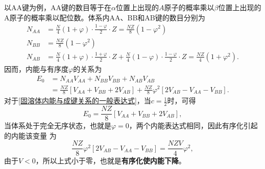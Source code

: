             以AA键为例，AA键的数目等于在$\alpha$位置上出现的$A$原子的概率乘以$\beta$位置上出现的
            A原子的概率乘以配位数。体系内AA、BB和AB键的数目分别为
            \begin{align}
                N_{A A}&=\frac{N}{4}(1+\varphi) \cdot \frac{1-\varphi}{2} \cdot Z=\frac{N Z}{8}\left(1-\varphi^{2}\right) \\
                N_{B B}&=\frac{N Z}{8}\left(1-\varphi^{2}\right) \\
                N_{A B}&=\frac{N}{4}(1+\varphi) \cdot \frac{1+\varphi}{2} \cdot Z+\frac{N}{4}(1-\varphi) \cdot \frac{1-\varphi}{2} \cdot Z=\frac{N Z}{4}(1+\varphi^2).
            \end{align}
            因而，内能与有序度$\varphi$的关系为
            \begin{align}
                E_{0}&=N_{A A} V_{A A}+N_{B B} V_{B B}+N_{A B} V_{A B} \\
                &=\frac{N Z}{8}\left[V_{A A}+V_{B B}+2 V_{A B}\right]+\frac{N Z}{8} \varphi^{2}\left[2 V_{A B}-V_{A A}-V_{B B}\right].
            \end{align}
            对于\autoref{固溶体内能与成键关系的一般表达式}，当$c=\frac{1}{2}$时，可得
            \begin{equation}
                E_{0}=\frac{N Z}{8}\left[V_{A A}+V_{B B}+2 V_{A B}\right],
            \end{equation}
            当体系处于完全无序状态，也就是$\varphi=0$，两个内能表达式相同，因此有序化引起的内能该变量
            为
            \begin{equation}
                \frac{N Z}{8} \varphi^{2}\left[2 V_{A B}-V_{A A}-V_{B B}\right]=\frac{NZV}{4}\varphi^2,
            \end{equation}
            由于$V<0$，所以上式小于零，也就是\textbf{有序化使内能下降}。

